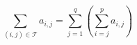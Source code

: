 \begin{displaymath}
 \sum_{(i,j)\in \mathcal T}a_{i,j} =\sum_{j=1}^{q}\left( \sum_{i=j}^{p} a_{i,j}\right)
\end{displaymath}
